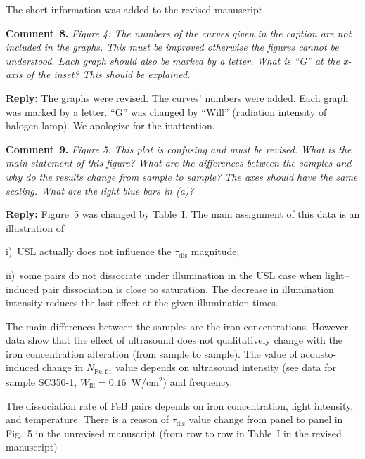 \documentclass[aip,jap,preprint]{revtex4-1}
\begin{document}
The short information was added to the revised manuscript.

\vspace{1cm}
\noindent
\textcolor[rgb]{0.00,0.50,1.00}{\textbf{Comment~8.}}
\emph{Figure 4: The numbers of the curves given in the caption are not included in the graphs. This must be improved otherwise the figures cannot be understood. Each graph should also be marked by a letter. What is ``G'' at the x-axis of the inset? This should be explained. }


\noindent
\textcolor[rgb]{0.51,0.00,0.00}{\textbf{Reply:}}
The graphs were revised.
The curves' numbers were added.
Each graph was marked by a letter.
``G'' was changed by ``Will'' (radiation intensity of halogen lamp).
We apologize for the inattention.


\vspace{1cm}
\noindent
\textcolor[rgb]{0.00,0.50,1.00}{\textbf{Comment~9.}}
\emph{Figure 5: This plot is confusing and must be revised. What is the main statement of this figure? What are the differences between the samples and why do the results change from sample to sample? The axes should have the same scaling. What are the light blue bars in (a)? }

\noindent
\textcolor[rgb]{0.51,0.00,0.00}{\textbf{Reply:}}
Figure~5 was changed by Table~Ι.
The main assignment of this data is an illustration of

\noindent
i)~USL actually does not influence the $\tau_\mathrm{dis}$  magnitude;

\noindent
ii)~some pairs do not dissociate under illumination in the USL case when light--induced pair dissociation is close to saturation.
The decrease in illumination intensity reduces the last effect at the given illumination times.

The main differences between the samples are the iron concentrations.
However, data show that
the effect of ultrasound does not qualitatively change with the iron concentration alteration
(from sample to sample).
The value of acousto-induced change in $N_\mathrm{Fe,fit}$ value depends on ultrasound intensity
(see data for sample SC350-1, $W_\mathrm{ill}=0.16$~W/cm$^2$) and frequency.


The dissociation rate of FeB pairs depends on iron concentration, light intensity, and
temperature\cite{Schmidt2019,FeBLight2,FeBKin2019,Lagowskii1993}.
There is a reason of $\tau_\mathrm{dis}$ value change from panel to panel in Fig.~5 in the unrevised manuscript (from row to row in Table~I in the revised manuscript)
\end{document}
